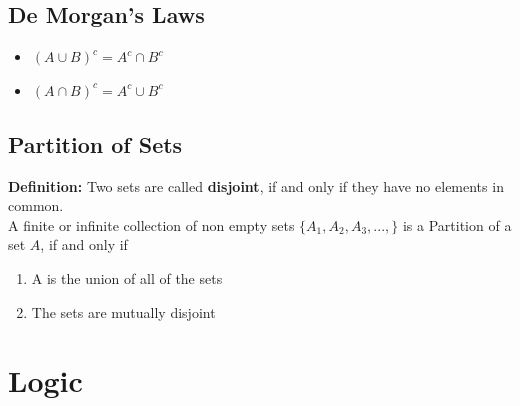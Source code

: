 \documentclass{report}
\begin{document}
    \bigbreak \noindent \bigbreak \noindent 
    \subsection{De Morgan's Laws}
    \bigbreak \noindent 
    \begin{itemize}
        \item $(A \cup B)^{c} = A^{c} \cap B^{c}$
        \item $(A \cap B)^{c} = A^{c} \cup B^{c}$
    \end{itemize}

    \bigbreak \noindent \bigbreak \noindent 
    \subsection{Partition of Sets}
    \bigbreak \noindent 
    \begin{mdframed}
        \textbf{Definition:}
        Two sets are called \textbf{disjoint}, if and only if they have no elements in common. \\
        A finite or infinite collection of non empty sets $\{A_{1}, A_{2}, A_{3}, ..., \} $ is a Partition of a set $A $, if and only if 
        \begin{enumerate}
            \item A is the union of all of the sets
            \item The sets are mutually disjoint
        \end{enumerate}
    \end{mdframed}
    \bigbreak \noindent 

    \pagebreak \bigbreak \noindent 
    \section{Logic}




    



    
\end{document}

